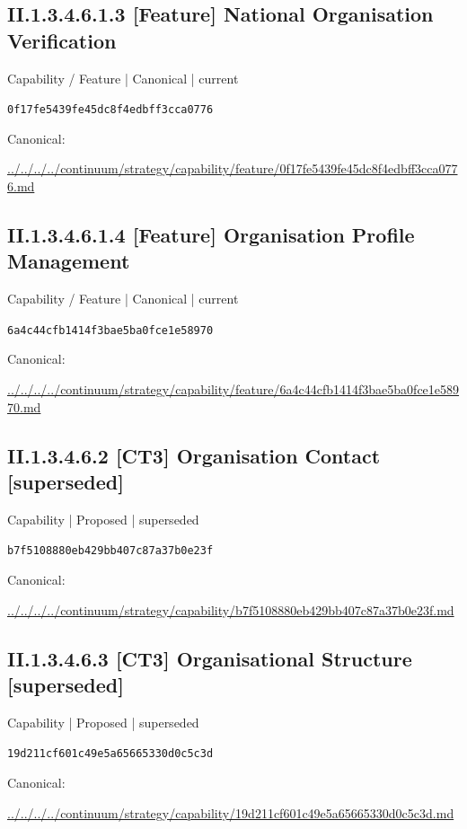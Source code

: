 \documentclass[10pt,a4paper]{article}
\begin{document}
\subsection*{II.1.3.4.6.1.3 [Feature] National Organisation Verification}
\label{element-0f17fe5439fe45dc8f4edbff3cca0776}
{\small Capability / Feature | Canonical | current}\par
\texttt{0f17fe5439fe45dc8f4edbff3cca0776}\par
Canonical: \par
{\footnotesize\url{../../../../continuum/strategy/capability/feature/0f17fe5439fe45dc8f4edbff3cca0776.md}}\par
\subsection*{II.1.3.4.6.1.4 [Feature] Organisation Profile Management}
\label{element-6a4c44cfb1414f3bae5ba0fce1e58970}
{\small Capability / Feature | Canonical | current}\par
\texttt{6a4c44cfb1414f3bae5ba0fce1e58970}\par
Canonical: \par
{\footnotesize\url{../../../../continuum/strategy/capability/feature/6a4c44cfb1414f3bae5ba0fce1e58970.md}}\par
\subsection*{II.1.3.4.6.2 [CT3] Organisation Contact [superseded]}
\label{element-b7f5108880eb429bb407c87a37b0e23f}
{\small Capability | Proposed | superseded}\par
\texttt{b7f5108880eb429bb407c87a37b0e23f}\par
Canonical: \par
{\footnotesize\url{../../../../continuum/strategy/capability/b7f5108880eb429bb407c87a37b0e23f.md}}\par
\subsection*{II.1.3.4.6.3 [CT3] Organisational Structure [superseded]}
\label{element-19d211cf601c49e5a65665330d0c5c3d}
{\small Capability | Proposed | superseded}\par
\texttt{19d211cf601c49e5a65665330d0c5c3d}\par
Canonical: \par
{\footnotesize\url{../../../../continuum/strategy/capability/19d211cf601c49e5a65665330d0c5c3d.md}}\par
\end{document}
